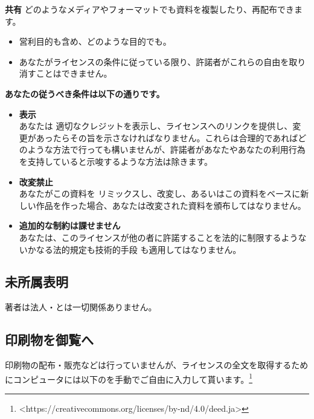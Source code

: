 \documentclass[lualatex, tate, landscape, paper=a4]{jlreq}
\newcommand{\yokoB}[1]{\hspace{0.1em}\hbox{\yoko \resizebox{1em}{0.66em}{#1}}\hspace{0.1em}}
\begin{document}
{\bfseries 共有} どのようなメディアやフォーマットでも資料を複製したり、再配布できます。
\begin{itemize}\item 営利目的も含め、どのような目的でも。

\item    あなたがライセンスの条件に従っている限り、許諾者がこれらの自由を取り消すことはできません。
\end{itemize} 

\begin{center}
  \bfseries
あなたの従うべき条件は以下の通りです。 
\end{center}
\begin{itemize}
  \item {\bfseries 表示}\\あなたは 適切なクレジットを表示し、ライセンスへのリンクを提供し、変更があったらその旨を示さなければなりません。これらは合理的であればどのような方法で行っても構いませんが、許諾者があなたやあなたの利用行為を支持していると示唆するような方法は除きます。 

  \item {\bfseries 改変禁止}\\あなたがこの資料を リミックスし、改変し、あるいはこの資料をベースに新しい作品を作った場合、あなたは改変された資料を頒布してはなりません。
  \item {\bfseries 追加的な制約は課せません}\\あなたは、このライセンスが他の者に許諾することを法的に制限するようないかなる法的規定も技術的手段 も適用してはなりません。
\end{itemize}
\subsection*{未所属表明}

著者は\yokoB{NPO}法人・とは一切関係ありません。

\subsection*{印刷物を御覧へ}
印刷物の配布・販売などは行っていませんが、ライセンスの全文を取得するためにコンピュータには以下の\yokoB{URL}を手動でご自由に入力して貰います。\footnote{
  {\ttfamily
<https://creativecommons.org/licenses/by-nd/4.0/deed.ja>
}}
\end{document}
